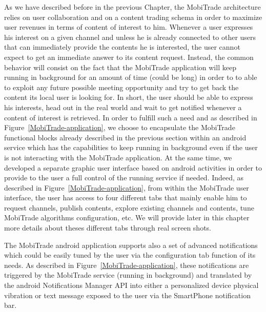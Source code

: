As we have described before in the previous Chapter, the MobiTrade architecture relies on user collaboration and on a content trading schema in order to maximize user revenues in terms of content of interest to him. Whenever a user expresses his interest on a given channel and unless he is already connected to other users that can immediately provide the contents he is interested, the user cannot expect to get an immediate answer to its content request. Instead, the common behavior will consist on the fact that the MobiTrade application will keep running in background for an amount of time (could be long) in order to to able to exploit any future possible meeting opportunity and try to get back the content its local user is looking for. In short, the user should be able to express his interests, head out in the real world and wait to get notified whenever a content of interest is retrieved.  In order to fulfill such a need and as described in Figure~\ref{MobiTrade-application}, we choose to encapsulate the MobiTrade functional blocks already described in the previous section within an android service which has the capabilities to keep running in background even if the user is not interacting with the MobiTrade application. At the same time, we developed a separate graphic user interface based on android activities in order to provide to the user a full control of the running service if needed. Indeed, as described in Figure~\ref{MobiTrade-application}, from within the MobiTrade user interface, the user has access to four different tabs that mainly enable him to request channels, publish contents, explore existing channels and contents, tune MobiTrade algorithms configuration, etc. We will provide later in this chapter more details about theses different tabs through real screen shots.

The MobiTrade android application supports also a set of advanced notifications which could be easily tuned by the user via the configuration tab function of its needs. As described in Figure~\ref{MobiTrade-application}, these notifications are triggered by the MobiTrade service (running in background) and translated by the android Notifications Manager API into either a personalized device physical vibration or text message exposed to the user via the SmartPhone notification bar. 


